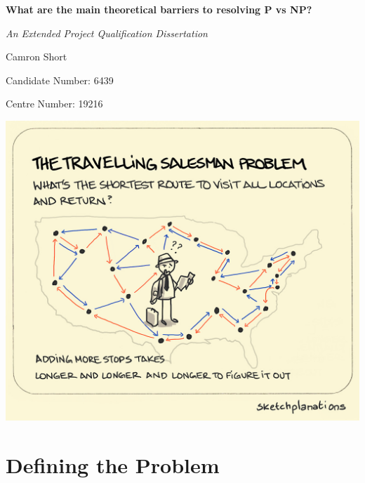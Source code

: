 \documentclass[12pt]{report}
\begin{document}
\begin{titlepage}
    \centering
    \vspace*{1cm}
    {\Huge\bfseries What are the main theoretical barriers to resolving P vs NP?\par}
    \vspace{1.5cm}
    {\Large\itshape An Extended Project Qualification Dissertation\par}
    \vspace{2cm}
    {\Large Camron Short\par}
    {\large Candidate Number: 6439\par}
    {\large Centre Number: 19216\par}
    \vspace{0.7cm}
    \includegraphics[width=1\textwidth]{CoverPhoto.jpg}
    \vspace{1cm}
    \thispagestyle{empty}
\end{titlepage}

\chapter{Defining the Problem}
\end{document}
